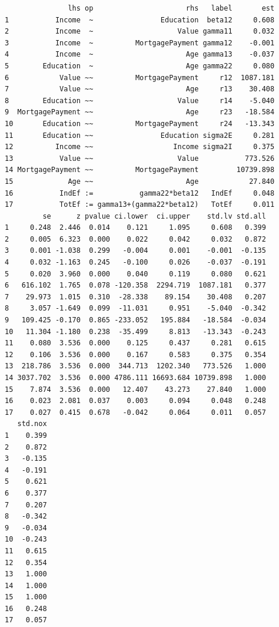 \begin{verbatim}
               lhs op                      rhs   label       est
1           Income  ~                Education  beta12     0.608
2           Income  ~                    Value gamma11     0.032
3           Income  ~          MortgagePayment gamma12    -0.001
4           Income  ~                      Age gamma13    -0.037
5        Education  ~                      Age gamma22     0.080
6            Value ~~          MortgagePayment     r12  1087.181
7            Value ~~                      Age     r13    30.408
8        Education ~~                    Value     r14    -5.040
9  MortgagePayment ~~                      Age     r23   -18.584
10       Education ~~          MortgagePayment     r24   -13.343
11       Education ~~                Education sigma2E     0.281
12          Income ~~                   Income sigma2I     0.375
13           Value ~~                    Value           773.526
14 MortgagePayment ~~          MortgagePayment         10739.898
15             Age ~~                      Age            27.840
16           IndEf :=           gamma22*beta12   IndEf     0.048
17           TotEf := gamma13+(gamma22*beta12)   TotEf     0.011
         se      z pvalue ci.lower  ci.upper    std.lv std.all
1     0.248  2.446  0.014    0.121     1.095     0.608   0.399
2     0.005  6.323  0.000    0.022     0.042     0.032   0.872
3     0.001 -1.038  0.299   -0.004     0.001    -0.001  -0.135
4     0.032 -1.163  0.245   -0.100     0.026    -0.037  -0.191
5     0.020  3.960  0.000    0.040     0.119     0.080   0.621
6   616.102  1.765  0.078 -120.358  2294.719  1087.181   0.377
7    29.973  1.015  0.310  -28.338    89.154    30.408   0.207
8     3.057 -1.649  0.099  -11.031     0.951    -5.040  -0.342
9   109.425 -0.170  0.865 -233.052   195.884   -18.584  -0.034
10   11.304 -1.180  0.238  -35.499     8.813   -13.343  -0.243
11    0.080  3.536  0.000    0.125     0.437     0.281   0.615
12    0.106  3.536  0.000    0.167     0.583     0.375   0.354
13  218.786  3.536  0.000  344.713  1202.340   773.526   1.000
14 3037.702  3.536  0.000 4786.111 16693.684 10739.898   1.000
15    7.874  3.536  0.000   12.407    43.273    27.840   1.000
16    0.023  2.081  0.037    0.003     0.094     0.048   0.248
17    0.027  0.415  0.678   -0.042     0.064     0.011   0.057
   std.nox
1    0.399
2    0.872
3   -0.135
4   -0.191
5    0.621
6    0.377
7    0.207
8   -0.342
9   -0.034
10  -0.243
11   0.615
12   0.354
13   1.000
14   1.000
15   1.000
16   0.248
17   0.057
\end{verbatim}

